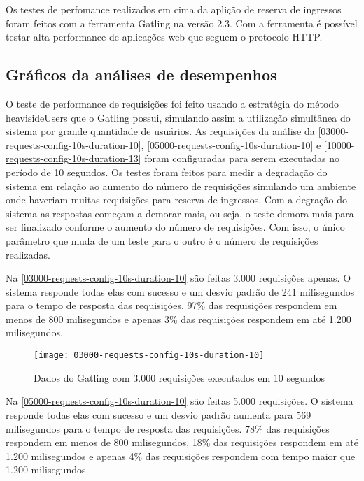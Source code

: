 Os testes de perfomance realizados em cima da aplição de reserva de ingressos foram
feitos com a ferramenta Gatling na versão 2.3.
Com a ferramenta é possível testar alta performance de aplicações web
\cite{gatling-docs} que seguem o protocolo HTTP.

\subsection{Gráficos da análises de desempenhos}

O teste de performance de requisições foi feito usando a
estratégia do método heavisideUsers \cite{gatling-simulation-setup}
que o Gatling possui, simulando assim a utilização simultânea do sistema por
grande quantidade de usuários.
As requisições da análise da
\autoref{03000-requests-config-10s-duration-10},
\autoref{05000-requests-config-10s-duration-10}
e \autoref{10000-requests-config-10s-duration-13}
foram configuradas para serem executadas no período de 10 segundos.
Os testes foram feitos para medir a degradação do sistema em relação ao aumento do
número de requisições simulando um ambiente onde haveriam muitas requisições para
reserva de ingressos.
Com a degração do sistema as respostas começam a demorar mais, ou seja,
o teste demora mais para ser finalizado conforme o aumento do número de requisições.
Com isso, o único parâmetro que muda de um teste para o outro
é o número de requisições realizadas.

Na \autoref{03000-requests-config-10s-duration-10} são feitas 3.000 requisições apenas.
O sistema responde todas elas com sucesso e um desvio padrão de 241 milisegundos
para o tempo de resposta das requisições.
97\% das requisições respondem em menos de 800 milisegundos e apenas 3\% das requisições
respondem em até 1.200 milisegundos.

\begin{figure}[h]
  \texttt{[image: 03000-requests-config-10s-duration-10]}
  \caption{Dados do Gatling com 3.000 requisições executados em 10 segundos}
  \label{03000-requests-config-10s-duration-10}
\end{figure}

Na \autoref{05000-requests-config-10s-duration-10} são feitas 5.000 requisições.
O sistema responde todas elas com sucesso e um desvio padrão aumenta para 569 milisegundos
para o tempo de resposta das requisições.
78\% das requisições respondem em menos de 800 milisegundos, 18\% das requisições
respondem em até 1.200 milisegundos e apenas 4\% das requisições
respondem com tempo maior que 1.200 milisegundos.

